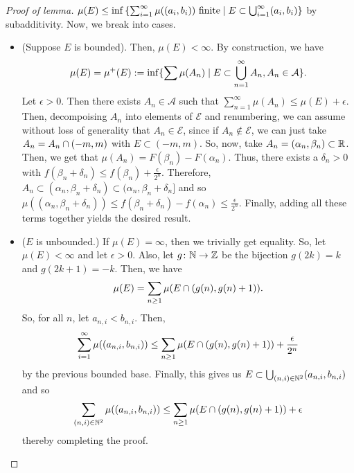 \documentclass[11pt,leqno,oneside]{amsbook}
\numberwithin{thm}{section}
\renewcommand{\A}{\mathcal{A}}
\newcommand{\Ep}{\mathcal{E}}
\begin{document}
\begin{proof}[Proof of lemma]
  $\mu(E) \leq \inf \left\{ \sum_{i=1}^\infty \mu((a_i,b_i)) \text{
        finite} \mid E
      \subset \bigcup_{i=1}^\infty (a_i,b_i) \right\}$ by
    subadditivity. Now, we break into cases.
    \begin{itemize}
    \item (Suppose $E$ is bounded). Then, $\mu(E) < \infty$. By
      construction, we have \[
        \mu(E) = \mu^+(E) := \inf\{ \sum \mu(A_n) \mid E \subset
        \Union_{n=1}^\infty A_n, A_n \in \A\}.
      \]
      Let $\epsilon > 0$. Then there exists $A_n \in \A$ such that
      $\sum_{n=1}^\infty \mu(A_n) \leq \mu(E) + \epsilon$. Then,
      decompoising $A_n$ into elements of $\Ep$ and renumbering, we
      can assume without loss of generality that $A_n \in \Ep$, since
      if $A_n \not \in \Ep$, we can just take $A_n = A_n \cap
      (-m,m)$ with $E \subset (-m,m)$. So, now, take $A_n = (\alpha_n,
      \beta_n) \subset {\mathbb R}$. Then, we get that $\mu(A_n) = F(\beta_n) -
      F(\alpha_n)$. Thus, there exists a $\delta_n > 0$ with
      $f(\beta_n + \delta_n) \leq f(\beta_n) +
      \frac{\epsilon}{2^n}$. Therefore, $A_n \subset
      (\alpha_n, \beta_n + \delta_n) \subset (\alpha_n, \beta_n +
      \delta_n]$ and so $\mu((\alpha_n,\beta_n+\delta_n)) \leq
      f(\beta_n + \delta_n) - f(\alpha_n) \leq
      \frac{\epsilon}{2^n}$. Finally, adding all these terms together
      yields the desired result.
    \item ($E$ is unbounded.) If $\mu(E) = \infty$, then we trivially
      get equality. So, let $\mu(E) < \infty$ and let $\epsilon >
      0$. Also, let $g \colon {\mathbb N} \to {\mathbb Z}$ be the bijection $g(2k) = k$
      and $g(2k+1) = -k$. Then, we have \[
        \mu(E) = \sum_{n \geq 1} \mu(E \cap (g(n),g(n)+1)).
      \]
      So, for all $n$, let $a_{n,i} < b_{n,i}$. Then, \[
        \sum_{i=1}^\infty \mu((a_{n,i},b_{n,i})) \leq \sum_{n \geq 1}
        \mu(E \cap (g(n),g(n)+1)) + \frac{\epsilon}{2^n}
      \]
      by the previous bounded base. Finally, this gives us $E \subset
      \bigcup_{(n,i) \in {\mathbb N}^2} (a_{n,i},b_{n,i})$ and so \[
        \sum_{(n,i) \in {\mathbb N}^2} \mu((a_{n,i},b_{n,i})) \leq \sum_{n \geq
        1} \mu(E
        \cap (g(n),g(n)+1)) + \epsilon
      \]
      thereby completing the proof.
    \end{itemize}
  \end{proof}
\end{document}
